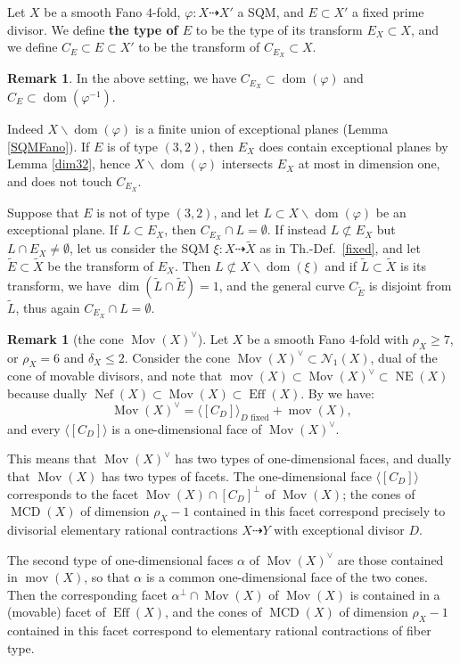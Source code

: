 \documentclass[a4paper,12pt]{amsart}
\theoremstyle{definition}
\newtheorem{remark}[thm]{Remark}
\numberwithin{figure}{section}
\numberwithin{table}{section}
\newcommand{\ph}{\varphi}
\newcommand{\w}{\widetilde}
\newcommand{\N}{\mathcal{N}_1}
\newcommand{\dom}{\operatorname{dom}}
\newcommand{\NE}{\operatorname{NE}}
\newcommand{\Eff}{\operatorname{Eff}}
\newcommand{\Nef}{\operatorname{Nef}}
\newcommand{\Mov}{\operatorname{Mov}}
\newcommand{\MCD}{\operatorname{MCD}}
\newcommand{\mov}{\operatorname{mov}}
\newcommand{\s}{\scriptscriptstyle}
\begin{document}
    Let $X$ be a smooth Fano $4$-fold, $\ph\colon X\dasharrow X'$ a SQM, and $E\subset X'$ a fixed prime divisor. We define {\bf the type of $E$} to be the type
    of its transform $E_{\s X}\subset X$, and we define $C_E\subset E\subset X'$ to be the transform of $C_{E_{\s X}}\subset X$.
    \begin{remark}\label{greg}
      In the above setting, we have $C_{E_X}\subset\dom(\ph)$ and $C_E\subset\dom(\ph^{-1})$. 

  Indeed $X\smallsetminus\dom(\ph)$ is a finite union of exceptional planes (Lemma \ref{SQMFano}). If $E$ is of type $(3,2)$, then $E_X$ does contain exceptional planes by Lemma \ref{dim32}, hence $X\smallsetminus\dom(\ph)$ intersects $E_X$ at most in dimension one, and does not touch $C_{E_X}$.

  Suppose that $E$ is not of type $(3,2)$, and let $L\subset X\smallsetminus\dom(\ph)$ be an exceptional plane. If $L\subset E_X$, then $C_{E_X}\cap L=\emptyset$. If instead $L\not\subset E_X$ but $L\cap E_X\neq\emptyset$, let us consider the SQM $\xi\colon X\dasharrow\w{X}$ as in Th.-Def.~\ref{fixed}, and let $\w{E}\subset\w{X}$ be the transform of $E_X$. Then $L\not\subset X\smallsetminus\dom(\xi)$ and if $\w{L}\subset\w{X}$ is its transform, we have $\dim(\w{L}\cap\w{E})=1$, and the general curve $C_{\w{E}}$ is disjoint from $\w{L}$, thus again $C_{E_X}\cap L=\emptyset$.
\end{remark}
     \begin{remark}[the cone $\Mov(X)^{\vee}$]\label{movdual}
   Let $X$ be a smooth Fano $4$-fold with $\rho_X\geq 7$, or $\rho_X=6$ and $\delta_X\leq 2$.
 Consider the cone $\Mov(X)^{\vee}\subset\N(X)$, dual of the cone of movable divisors, and note that $\mov(X)\subset\Mov(X)^{\vee}\subset\NE(X)$ because dually $\Nef(X)\subset\Mov(X)\subset\Eff(X)$. By 
  \cite[Lemma 5.29]{blowup} we have:
  $$\Mov(X)^{\vee}=\langle [C_D]\rangle_{D\text{ fixed}}+\mov(X),$$
  and every $\langle[C_D]\rangle$ is a one-dimensional face of  $\Mov(X)^{\vee}$.

  This means that $\Mov(X)^{\vee}$ has two types of one-dimensional faces, and dually that $\Mov(X)$ has two types of facets. The one-dimensional face $\langle[C_D]\rangle$ 
  corresponds to the facet $\Mov(X)\cap [C_D]^{\perp}$ of $\Mov(X)$; the cones of $\MCD(X)$ of dimension $\rho_X-1$ contained in this facet correspond precisely to divisorial elementary rational contractions $X\dasharrow Y$ with exceptional divisor $D$.

  The second type of one-dimensional faces $\alpha$ of $\Mov(X)^{\vee}$ are those contained in $\mov(X)$, so that $\alpha$ is a common one-dimensional face of the two cones. Then the corresponding facet $\alpha^{\perp}\cap\Mov(X)$ of $\Mov(X)$ is contained in a (movable) facet of $\Eff(X)$, and  the cones of $\MCD(X)$ of dimension $\rho_X-1$ contained in this facet correspond  to  elementary rational contractions of fiber type.
\end{remark}
\end{document}
